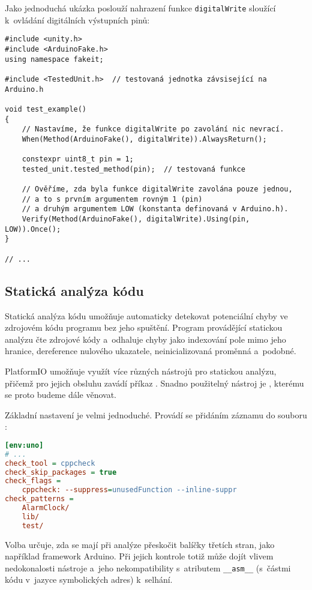 Jako jednoduchá ukázka poslouží nahrazení funkce \texttt{digitalWrite} sloužící
k~ovládání digitálních výstupních pinů:
\begin{lstlisting}[language=myC++]
#include <unity.h>
#include <ArduinoFake.h>
using namespace fakeit;

#include <TestedUnit.h>  // testovaná jednotka závsisející na Arduino.h

void test_example()
{
    // Nastavíme, že funkce digitalWrite po zavolání nic nevrací.
    When(Method(ArduinoFake(), digitalWrite)).AlwaysReturn();

    constexpr uint8_t pin = 1;
    tested_unit.tested_method(pin);  // testovaná funkce

    // Ověříme, zda byla funkce digitalWrite zavolána pouze jednou,
    // a to s prvním argumentem rovným 1 (pin)
    // a druhým argumentem LOW (konstanta definovaná v Arduino.h).
    Verify(Method(ArduinoFake(), digitalWrite).Using(pin, LOW)).Once();
}

// ...
\end{lstlisting}


\subsection{Statická analýza kódu}
Statická analýza kódu umožňuje automaticky detekovat potenciální chyby ve
zdrojovém kódu programu bez jeho spuštění. Program provádějící statickou
analýzu čte zdrojové kódy a~odhaluje chyby jako indexování pole mimo jeho
hranice, dereference nulového ukazatele, neinicializovaná proměnná a~podobné.

PlatformIO umožňuje využít více různých nástrojů pro statickou analýzu, přičemž
pro jejich obsluhu zavádí příkaz . Snadno použitelný
nástroj je , kterému se proto budeme dále věnovat.

Základní nastavení je velmi jednoduché. Provádí se přidáním záznamu do souboru
:
\begin{lstlisting}[language=Ini]
[env:uno]
# ...
check_tool = cppcheck
check_skip_packages = true
check_flags = 
	cppcheck: --suppress=unusedFunction --inline-suppr
check_patterns = 
	AlarmClock/
	lib/
	test/
\end{lstlisting}
Volba  určuje, zda se mají při analýze přeskočit
balíčky třetích stran, jako například framework Arduino. Při jejich
kontrole totiž může dojít vlivem nedokonalosti nástroje 
a~jeho nekompatibility s~atributem \lstinline[language={[GNU]C++}]!__asm__!
(s~částmi kódu v~jazyce symbolických adres) k~selhání.


